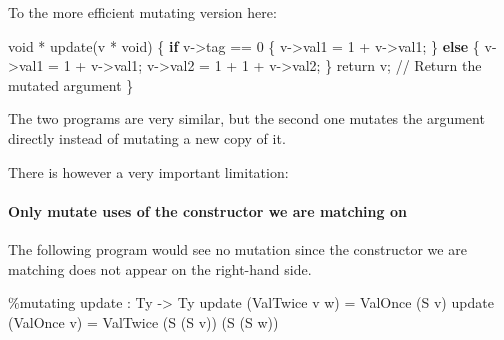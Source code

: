 \documentclass[
]{article}
\newenvironment{Shaded}{}{}
\newcommand{\DataTypeTok}[1]{\textcolor[rgb]{0.56,0.13,0.00}{#1}}
\newcommand{\DecValTok}[1]{\textcolor[rgb]{0.25,0.63,0.44}{#1}}
\newcommand{\FunctionTok}[1]{\textcolor[rgb]{0.02,0.16,0.49}{#1}}
\newcommand{\KeywordTok}[1]{\textcolor[rgb]{0.00,0.44,0.13}{\textbf{#1}}}
\newcommand{\NormalTok}[1]{#1}
\newcommand{\OperatorTok}[1]{\textcolor[rgb]{0.40,0.40,0.40}{#1}}
\newcommand{\OtherTok}[1]{\textcolor[rgb]{0.00,0.44,0.13}{#1}}
\begin{document}
To the more efficient mutating version here:

\begin{Shaded}
\begin{Highlighting}[]
\NormalTok{void }\OperatorTok{*}\NormalTok{ update(v }\OperatorTok{*}\NormalTok{ void) \{}
    \KeywordTok{if}\NormalTok{ v}\OtherTok{{-}\textgreater{}}\NormalTok{tag }\OperatorTok{==} \DecValTok{0}\NormalTok{ \{}
\NormalTok{        v}\OtherTok{{-}\textgreater{}}\NormalTok{val1 }\OtherTok{=} \DecValTok{1} \OperatorTok{+}\NormalTok{ v}\OtherTok{{-}\textgreater{}}\NormalTok{val1;}
\NormalTok{    \} }\KeywordTok{else}\NormalTok{ \{}
\NormalTok{        v}\OtherTok{{-}\textgreater{}}\NormalTok{val1 }\OtherTok{=} \DecValTok{1} \OperatorTok{+}\NormalTok{ v}\OtherTok{{-}\textgreater{}}\NormalTok{val1;}
\NormalTok{        v}\OtherTok{{-}\textgreater{}}\NormalTok{val2 }\OtherTok{=} \DecValTok{1} \OperatorTok{+} \DecValTok{1} \OperatorTok{+}\NormalTok{ v}\OtherTok{{-}\textgreater{}}\NormalTok{val2;}
\NormalTok{    \}}
    \FunctionTok{return}\NormalTok{ v; }\OperatorTok{//} \DataTypeTok{Return}\NormalTok{ the mutated argument}
\NormalTok{\}}
\end{Highlighting}
\end{Shaded}

The two programs are very similar, but the second one mutates the
argument directly instead of mutating a new copy of it.

There is however a very important limitation:

\hypertarget{only-mutate-uses-of-the-constructor-we-are-matching-on}{%
\paragraph{Only mutate uses of the constructor we are matching
on}\label{only-mutate-uses-of-the-constructor-we-are-matching-on}}

The following program would see no mutation since the constructor we are
matching does not appear on the right-hand side.

\begin{Shaded}
\begin{Highlighting}[]
\OperatorTok{\%}\NormalTok{mutating}
\NormalTok{update }\OperatorTok{:} \DataTypeTok{Ty} \OtherTok{{-}\textgreater{}} \DataTypeTok{Ty}
\NormalTok{update (}\DataTypeTok{ValTwice}\NormalTok{ v w) }\OtherTok{=} \DataTypeTok{ValOnce}\NormalTok{ (}\DataTypeTok{S}\NormalTok{ v)}
\NormalTok{update (}\DataTypeTok{ValOnce}\NormalTok{ v) }\OtherTok{=} \DataTypeTok{ValTwice}\NormalTok{ (}\DataTypeTok{S}\NormalTok{ (}\DataTypeTok{S}\NormalTok{ v)) (}\DataTypeTok{S}\NormalTok{ (}\DataTypeTok{S}\NormalTok{ w))}
\end{Highlighting}
\end{Shaded}
\end{document}
